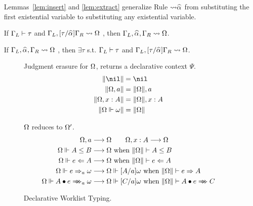 Lemmas~\ref{lem:insert} and \ref{lem:extract}
generalize Rule $\mathtt{{\sto}\al}$ from substituting the first existential variable
to substituting any existential variable.

\begin{lemma}[Insert]\label{lem:insert}
If $\Gamma_L\vdash \tau$ and $\Gm_L, [\tau/\al]\Gm_R \sto \Om$
, then $\Gm_L, \al, \Gm_R \sto \Om$.
\end{lemma}
\begin{lemma}[Extract]\label{lem:extract}
If $\Gm_L, \al, \Gm_R \sto \Om$
, then $\exists \tau$ s.t. $\Gamma_L\vdash\tau$ and $\Gm_L, [\tau/\al]\Gm_R \sto \Om$.
\end{lemma}

\begin{figure}[t]
\framebox{$\|\Om\|$} Judgment erasure for $\Omega$, returns a declarative context $\Psi$.
\begin{gather*}
\begin{aligned}
\|\nil\| &= \nil\\
\|\Om,a\| &= \|\Om\|, a\\
\|\Om,x:A\| &= \|\Om\|, x:A\\
\|\Om\Vdash\jg\| &= \|\Om\|
\end{aligned}
\end{gather*}

 $\Omega$ reduces to $\Omega'$.
\begin{gather*}
\begin{aligned}
\Om,a &\rto \Om \qquad \Om,x:A \rto \Om\\
\Om\Vdash A\le B &\rto \Om \text{ when } \|\Om\| \vdash A\le B\\
\Om\Vdash e\Lto A &\rto \Om \text{ when } \|\Om\| \vdash e\Lto A\\
\Om\Vdash e\To_a \jg &\rto \Om\Vdash[A/a]\jg \text{ when } \|\Om\| \vdash e\To A\\
\Om\Vdash \appInfAlg{A}{e} &\rto \Om\Vdash[C/a]\jg \text{ when } \|\Om\| \vdash \appInf{A}{e}{C}\\
\end{aligned}
\end{gather*}
\caption{Declarative Worklist Typing.}
\label{fig:decl:worklist}
\end{figure}

